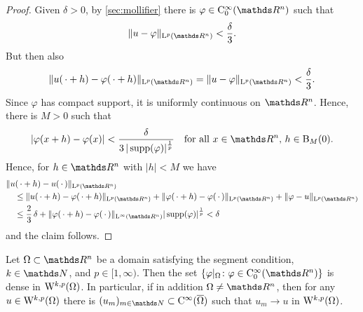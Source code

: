 \begin{proof}
  Given $\delta > 0$, by \ref{sec:mollifier} there is $\varphi \in \CC_0^\infty(\R^n)$ such that
  $$
  \|u - \varphi\|_{\Ell^p(\R^n)} < \frac{\delta}{3}.
  $$
  But then also
  $$
  \|u(\,\cdot + h) - \varphi(\,\cdot + h) \|_{\Ell^p(\R^n)} = \|u - \varphi\|_{\Ell^p(\R^n)} < \frac{\delta}{3}.
  $$
  Since $\varphi$ has compact support, it is uniformly continuous on $\R^n$.
  Hence, there is $M > 0$ such that
  $$
  |\varphi(x + h) - \varphi(x)| < \frac{\delta}{3 \, |\supp(\varphi)|^{\frac{1}{p}}} \quad\text{for all } x \in \R^n\text{, } h \in \BB_M(0).
  $$
  Hence, for $h \in \R^n$ with $|h| < M$ we have
  \begin{align*}
    &\|u(\,\cdot + h) - u(\,\cdot\,)\|_{\Ell^p(\R^n)} \\
    &\quad \leq \|u(\,\cdot + h) - \varphi(\,\cdot + h) \|_{\Ell^p(\R^n)} + \|\varphi(\,\cdot + h) - \varphi(\,\cdot\,) \|_{\Ell^p(\R^n)} +  \|\varphi - u \|_{\Ell^p(\R^n)} \\
    &\quad\leq \frac{2}{3}\,\delta +  \|\varphi(\,\cdot + h) - \varphi(\,\cdot\,)\|_{\Ell^\infty(\R^n)} |\supp(\varphi)|^{\frac{1}{p}} 
    < \delta
  \end{align*}
  and the claim follows.
\end{proof}

\setcounter{equation}{3} %

\begin{thm}
  \label{thm:CinftyUpToBoundary}
  Let $\Omega \subset \R^n$ be a domain satisfying the segment condition, $k \in \N$, and $p \in [1,\infty)$.
    Then the set 
    $
    \{ \varphi|_\Omega \colon \varphi \in \CC_0^\infty(\R^n) \}
    $
    is dense in $\mathrm{W}^{k,p}(\Omega)$.
    In particular, if in addition $\Omega \neq \R^n$, then for any $u \in \mathrm{W}^{k,p}(\Omega)$ there is $(u_m)_{m \in \N} \subset \CC^\infty(\overline \Omega)$ such that $u_m \to u$ in $\mathrm{W}^{k,p}(\Omega)$.
\end{thm}

